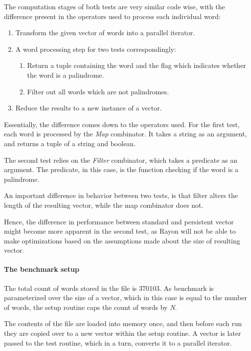 The computation stages of both tests are very similar code wise, with the difference present in the operators used to process each individual word:

\begin{enumerate}
    \item Transform the given vector of words into a parallel iterator. 
    \item A word processing step for two tests correspondingly:
    \begin{enumerate}
        \item Return a tuple containing the word and the flag which indicates whether the word is a palindrome. 
        \item Filter out all words which are not palindromes. 
    \end{enumerate}
    \item Reduce the results to a new instance of a vector.  
\end{enumerate}

Essentially, the difference comes down to the operators used. For the first test, each word is processed by the \emph{Map} combinator. It takes a string as an argument, and returns a tuple of a string and boolean. 

The second test relies on the \emph{Filter} combinator, which takes a predicate as an argument. The predicate, in this case, is the function checking if the word is a palindrome. 

An important difference in behavior between two tests, is that filter alters the length of the resulting vector, while the map combinator does not. 

Hence, the difference in performance between standard and persistent vector might become more apparent in the second test, as Rayon will not be able to make optimizations based on the assumptions made about the size of resulting vector. 

\paragraph*{The benchmark setup}
The total count of words stored in the file is 370103. As benchmark is parameterized over the size of a vector, which in this case is equal to the number of words, the setup routine caps the count of words by \emph{N}. 

The contents of the file are loaded into memory once, and then before each run they are copied over to a new vector within the setup routine. A vector is later passed to the test routine, which in a turn, converts it to a parallel iterator. 

